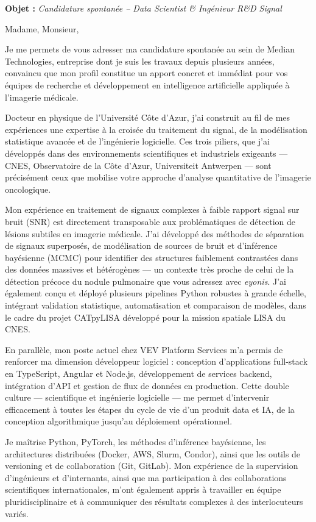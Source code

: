 \documentclass[11pt,a4paper]{altacv}
\begin{document}
\makecvheader
\iffalse
{}
{\color{accent}\textbf{Objet :}} \textit{Candidature spontanée -- Data Scientist \& Ingénieur R\&D Signal}

{\color{body}

Madame, Monsieur,

Je me permets de vous adresser ma candidature spontanée au sein de Median Technologies, entreprise dont je suis les travaux depuis plusieurs années, convaincu que mon profil constitue un apport concret et immédiat pour vos équipes de recherche et développement en intelligence artificielle appliquée à l'imagerie médicale.

Docteur en physique de l'Université Côte d'Azur, j'ai construit au fil de mes expériences une expertise à la croisée du traitement du signal, de la modélisation statistique avancée et de l'ingénierie logicielle. Ces trois piliers, que j'ai développés dans des environnements scientifiques et industriels exigeants — CNES, Observatoire de la Côte d'Azur, Universiteit Antwerpen — sont précisément ceux que mobilise votre approche d'analyse quantitative de l'imagerie oncologique.

Mon expérience en traitement de signaux complexes à faible rapport signal sur bruit (SNR) est directement transposable aux problématiques de détection de lésions subtiles en imagerie médicale. J'ai développé des méthodes de séparation de signaux superposés, de modélisation de sources de bruit et d'inférence bayésienne (MCMC) pour identifier des structures faiblement contrastées dans des données massives et hétérogènes — un contexte très proche de celui de la détection précoce du nodule pulmonaire que vous adressez avec \textit{eyonis\texttrademark}. J'ai également conçu et déployé plusieurs pipelines Python robustes à grande échelle, intégrant validation statistique, automatisation et comparaison de modèles, dans le cadre du projet CATpyLISA développé pour la mission spatiale LISA du CNES.

En parallèle, mon poste actuel chez VEV Platform Services m'a permis de renforcer ma dimension développeur logiciel : conception d'applications full-stack en TypeScript, Angular et Node.js, développement de services backend, intégration d'API et gestion de flux de données en production. Cette double culture — scientifique et ingénierie logicielle — me permet d'intervenir efficacement à toutes les étapes du cycle de vie d'un produit data et IA, de la conception algorithmique jusqu'au déploiement opérationnel.

Je maîtrise Python, PyTorch, les méthodes d'inférence bayésienne, les architectures distribuées (Docker, AWS, Slurm, Condor), ainsi que les outils de versioning et de collaboration (Git, GitLab). Mon expérience de la supervision d'ingénieurs et d'internants, ainsi que ma participation à des collaborations scientifiques internationales, m'ont également appris à travailler en équipe pluridisciplinaire et à communiquer des résultats complexes à des interlocuteurs variés.

}
\end{document}
